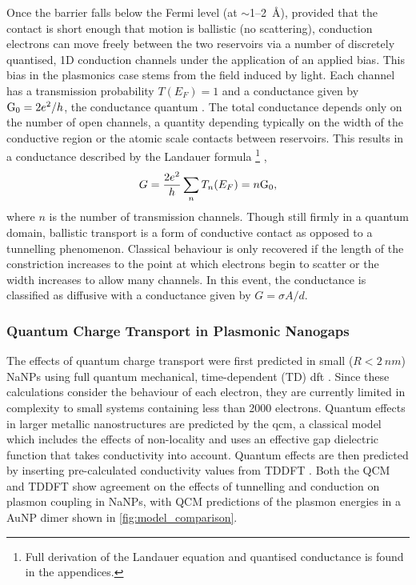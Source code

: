 \documentclass{article}
\begin{document}
Once the barrier falls below the Fermi level (at $\sim$1--\SI{2}{\angstrom}), provided that the contact is short enough that motion is ballistic (no scattering), conduction electrons can move freely between the two reservoirs via a number of discretely quantised, 1D conduction channels under the application of an applied bias. This bias in the plasmonics case stems from the field induced by light. Each channel has a transmission probability $T(E_F)=1$ and a conductance given by $\mathrm{G_{0}} = 2e^2/h$, the conductance quantum \cite{landauer1957spatial}. The total conductance depends only on the number of open channels, a quantity depending typically on the width of the conductive region or the atomic scale contacts between reservoirs. This results in a conductance described by the Landauer formula%
\footnote{Full derivation of the Landauer equation and quantised conductance is found in the appendices.} \cite{landauer1957spatial},
\begin{equation}
G = \frac{2e^2}{h}\sum_n T_n(E_F) = n\mathrm{G_{0}}, \label{eq:landauer}
\end{equation}
where $n$ is the number of transmission channels. Though still firmly in a quantum domain, ballistic transport is a form of conductive contact as opposed to a tunnelling phenomenon. Classical behaviour is only recovered if the length of the constriction increases to the point at which electrons begin to scatter or the width increases to allow many channels. In this event, the conductance is classified as diffusive with a conductance given by $G=\sigma A/d$.

\subsubsection{Quantum Charge Transport in Plasmonic Nanogaps}

The effects of quantum charge transport were first predicted in small ($R<\SI{2}{nm}$) NaNPs using full quantum mechanical, time-dependent (TD) \gls{dft} \cite{zuloaga2009}. Since these calculations consider the behaviour of each electron, they are currently limited in complexity to small systems containing less than 2000 electrons. Quantum effects in larger metallic nanostructures are predicted by the \gls{qcm}, a classical model which includes the effects of non-locality and uses an effective gap dielectric function that takes conductivity into account. Quantum effects are then predicted by inserting pre-calculated conductivity values from TDDFT \cite{esteban2012}. Both the QCM and TDDFT show agreement on the effects of tunnelling and conduction on plasmon coupling in NaNPs, with QCM predictions of the plasmon energies in a AuNP dimer shown in \autoref{fig:model_comparison}.
\end{document}
